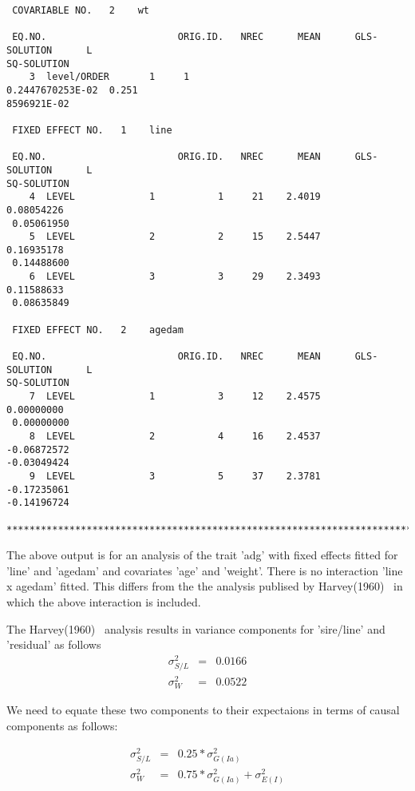 \documentclass[titlepage]{article}  %
\begin{document}
\begin{verbatim}
 COVARIABLE NO.   2    wt          

 EQ.NO.                       ORIG.ID.   NREC      MEAN      GLS-SOLUTION      L
SQ-SOLUTION
    3  level/ORDER       1     1                         0.2447670253E-02  0.251
8596921E-02

 FIXED EFFECT NO.   1    line        

 EQ.NO.                       ORIG.ID.   NREC      MEAN      GLS-SOLUTION      L
SQ-SOLUTION
    4  LEVEL             1           1     21    2.4019        0.08054226       
 0.05061950
    5  LEVEL             2           2     15    2.5447        0.16935178       
 0.14488600
    6  LEVEL             3           3     29    2.3493        0.11588633       
 0.08635849

 FIXED EFFECT NO.   2    agedam      

 EQ.NO.                       ORIG.ID.   NREC      MEAN      GLS-SOLUTION      L
SQ-SOLUTION
    7  LEVEL             1           3     12    2.4575        0.00000000       
 0.00000000
    8  LEVEL             2           4     16    2.4537       -0.06872572       
-0.03049424
    9  LEVEL             3           5     37    2.3781       -0.17235061       
-0.14196724

********************************************************************************
\end{verbatim}

The above output is for an analysis of the trait 'adg' with fixed effects fitted for 'line' and 'agedam' and covariates 'age' and 'weight'. There is no interaction 'line x agedam' fitted. This differs from the the analysis publised by Harvey(1960)~\cite{harv:60} in which the above interaction is included. 

The Harvey(1960)~\cite{harv:60} analysis results in variance components for 'sire/line' and 'residual' as follows
\begin{eqnarray*}
\sigma^{2}_{S/L} & = & 0.0166 \\
\sigma^{2}_{W}   & = & 0.0522
\end{eqnarray*}

We need to equate these two components to their expectaions in terms of causal components as follows:

\begin{eqnarray*}
\sigma^{2}_{S/L} & = & 0.25 * \sigma^{2}_{G(Ia)} \\
\sigma^{2}_{W}   & = & 0.75 * \sigma^{2}_{G(Ia)} + \sigma^{2}_{E(I)}
\end{eqnarray*}
\end{document}
